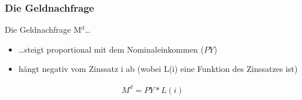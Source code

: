 \documentclass[11pt]{article}
\begin{document}
\subsubsection{Die Geldnachfrage}
\label{sec:orgb1328f1}
Die Geldnachfrage M\(^{\text{d}}\)\ldots{}
\begin{itemize}
\item \ldots{}steigt proportional mit dem Nominaleinkommen (\(PY\))
\item hängt negativ vom Zinssatz i ab (wobei L(i) eine Funktion des Zinssatzes ist)
\end{itemize}
\begin{equation*}
\begin{aligned}
M^d = PY*L(i)
\end{aligned}
\end{equation*}
\end{document}
